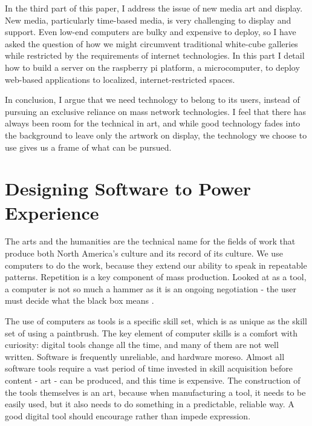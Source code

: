 In the third part of this paper, I address the issue of new media art and display. New media, particularly time-based media, is very challenging to display and support. Even low-end computers are bulky and expensive to deploy, so I have asked the question of how we might circumvent traditional white-cube galleries while restricted by the requirements of internet technologies. In this part I detail how to build a server on the raspberry pi platform, a microcomputer, to deploy web-based applications to localized, internet-restricted spaces. 

In conclusion, I argue that we need technology to belong to its users, instead of pursuing an exclusive reliance on mass network technologies. I feel that there has always been room for the technical in art, and while good technology fades into the background to leave only the artwork on display, the technology we choose to use gives us a frame of what can be pursued. 


\section{Designing Software to Power Experience}
The arts and the humanities are the technical name for the fields of work that produce both North America’s culture and its record of its culture. We use computers to do the work, because they extend our ability to speak in repeatable patterns. Repetition is a key component of mass production. Looked at as a tool, a computer is not so much a hammer as it is an ongoing negotiation - the user must decide what the black box means \cite{glanville}.

The use of computers as tools is a specific skill set, which is as unique as the skill set of using a paintbrush. The key element of computer skills is a comfort with curiosity: digital tools change all the time, and many of them are not well written. Software is frequently unreliable, and hardware moreso. Almost all software tools require a vast period of time invested in skill acquisition before content - art - can be produced, and this time is expensive. The construction of the tools themselves is an art, because when manufacturing a tool, it needs to be easily used, but it also needs to do something in a predictable, reliable way. A good digital tool should encourage rather than impede expression. 

